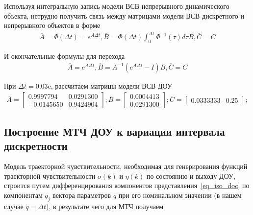 Используя интегральную запись модели ВСВ непрерывного динамического объекта, нетрудно получить связь между матрицами модели ВСВ дискретного и непрерывного объектов в форме
\begin{align}
	\overline{A} = \Phi (\Delta t) = e^{A \Delta t},
	\overline{B} = \Phi (\Delta t) \int_0^{\Delta t} \Phi^{-1} (\tau) d \tau B,
	\overline{C} = C
\end{align}

И окончательные формулы для перехода
\begin{align}
	\overline{A} = e^{A \Delta t},
	\overline{B} = A^{-1} (e^{A \Delta t} - I)B,
	\overline{C} = C  
\end{align}

При $\Delta t = 0.03$c, рассчитаем матрицы модели ВСВ ДОУ
\begin{align*}
	\overline{A} =
	\begin{bmatrix}
		0.9997794 &   0.0291300\\  
		- 0.0145650  &  0.9424904 
	\end{bmatrix};
	\overline{B} =
	\begin{bmatrix}
		0.0004413 \\
		0.0291300 
	\end{bmatrix};
	\overline{C} =
	\begin{bmatrix}
		 0.0333333  &  0.25 
	\end{bmatrix};
\end{align*}

\subsection{Построение МТЧ ДОУ к вариации интервала дискретности}

Модель траекторной чувствительности, необходимая для генерирования функций траекторной чувствительности $\sigma(k)$ и $\eta(k)$ по состоянию и выходу ДОУ, строится путем дифференцирования компонентов представления~\ref{eq_iso_doc} по компонентам $q_j$ вектора параметров $q$ при его номинальном значении (в нашем случае $q = \Delta t$), в результате чего для МТЧ получаем

